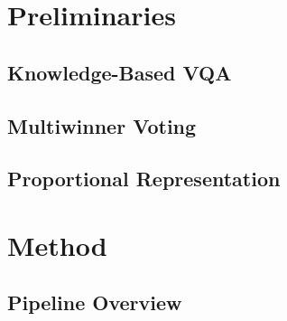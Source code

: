 \documentclass[sigconf]{aamas}
\begin{document}
\section{Preliminaries}


\subsection{Knowledge-Based VQA}

\subsection{Multiwinner Voting}

\subsection{Proportional Representation}

\section{Method}

\subsection{Pipeline Overview}
\end{document}
